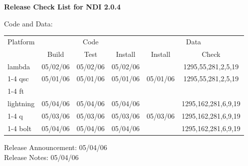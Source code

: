 \begin{center}\Large\bf
Release Check List for NDI 2.0.4
\end{center}
\vspace{24pt}

Code and Data:

\begin{tabular}{|l|c|c|c||c|c|} \hline
Platform & \multicolumn{3}{c||}{Code}       & \multicolumn{2}{c|}{Data}\\  
         & Build    & Test     & Install  & Install  & Check \\ \hline 
lambda   & 05/02/06 & 05/02/06 & 05/02/06 &          &
         1295,55,281,2,5,19 \\ \cline{1-4} \cline{6-6}
qsc      & 05/01/06 & 05/01/06 & 05/01/06 & 05/01/06 &
         1295,55,281,2,5,19 \\ \cline{1-4} \cline{6-6}
ft       &          &          &          &          &       \\ \hline
lightning& 05/04/06 & 05/04/06 & 05/04/06 &          &
         1295,162,281,6,9,19 \\ \cline{1-4} \cline{6-6}
q        & 05/03/06 & 05/03/06 & 05/03/06 & 05/03/06 &
         1295,162,281,6,9,19\\ \cline{1-4} \cline{6-6}
bolt     & 05/04/06 & 05/04/06 & 05/04/06 &          &
         1295,162,281,6,9,19\\ \hline
\end{tabular}

\vspace{12pt}
Release Announcement: 05/04/06\\
\vspace{12pt}
Release Notes: 05/04/06
